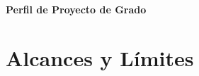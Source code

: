 \documentclass[12pt]{article}
\begin{document}


\onehalfspacing

\renewcommand{\contentsname}{\'{I}ndice}
\tableofcontents
\newpage

\begin{center}
    {\Large \textbf{Perfil de Proyecto de Grado}}
\end{center}

\vspace{0.5cm}






\section{Alcances y L\'{i}mites}





\end{document}
